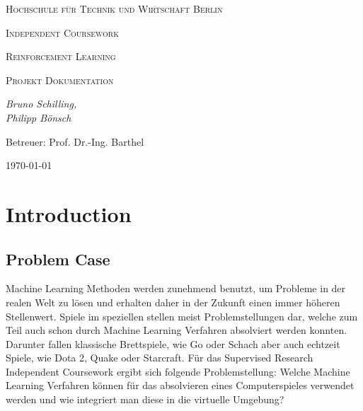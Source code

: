 \documentclass[11pt]{scrartcl}
\begin{document}

\begin{titlepage}
	\centering
	{\scshape\LARGE Hochschule für Technik und Wirtschaft Berlin \par}
	\vspace{2cm}
	{\Huge \scshape{Independent Coursework}\par}
	\vspace{2cm}
	{\LARGE \scshape{Reinforcement Learning}\par}
	{\scshape\Large Projekt Dokumentation\par}
	\vspace{4cm}
	{\large\itshape Bruno Schilling,\\Philipp Bönsch\par}
	\vfill
	
	{\large Betreuer: Prof. Dr.-Ing. Barthel \par}
	\vspace{1cm}
	{\large \today\par}
\end{titlepage}

\lstset{basicstyle=\ttfamily\small,breaklines=true}
\newpage
\tableofcontents
\newpage
\section{Introduction}

\subsection{Problem Case}
Machine Learning Methoden werden zunehmend benutzt, um Probleme in der realen Welt zu
lösen und erhalten daher in der Zukunft einen immer höheren Stellenwert. Spiele im
speziellen stellen meist Problemstellungen dar, welche zum Teil auch schon durch Machine
Learning Verfahren absolviert werden konnten. Darunter fallen klassische Brettspiele, wie Go
oder Schach\cite{DM2018} aber auch echtzeit Spiele, wie Dota 2\cite{OA2019},
Quake\cite{DM2019} oder Starcraft\cite{DM2019_2}. Für das Supervised Research Independent Coursework
ergibt sich folgende Problemstellung: Welche Machine Learning Verfahren können für das
absolvieren eines Computerspieles verwendet werden und wie integriert man diese in die
virtuelle Umgebung?
\end{document}
